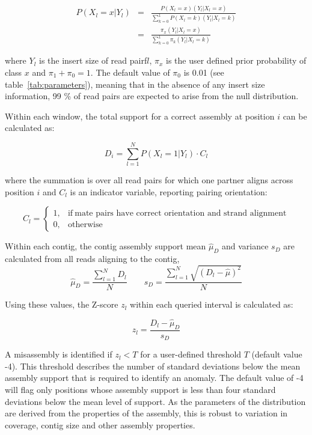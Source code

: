 \documentclass[fleqn,10pt]{wlpeerj}
\begin{document}
\begin{eqnarray} P(X_l=x|Y_l)& =& \frac{P(X_l=x)(Y_l|X_l=x)}{\sum_{k=0}^1P(X_l=k)(Y_l|X_l=k)}\\
  & =& \frac{\pi_x(Y_l|X_l=x)}{\sum_{k=0}^1 \pi_k(Y_l|X_l=k)}
\label{eq:posterior}  
\end{eqnarray}

where $Y_l$ is the insert size of read pairf$l$, $\pi_x$ is the user defined prior probability of class $x$ and $\pi_1 + \pi_0 = 1$. The default value of $\pi_0$ is 0.01 (see table~\ref{tab:parameters}), meaning that in the absence of any insert size information, 99 \% of read pairs are expected to arise from the null distribution.  

Within each window, the total support for a correct assembly at position $i$ can be calculated as:

\begin{equation}
D_i = \sum_{l=1}^N P(X_l=1|Y_l)\cdot C_l
\end{equation}

where the summation is over all read pairs for which one partner aligns across position $i$ and $C_l$ is an indicator variable, reporting pairing orientation:

\begin{equation}
    C_l=
    \begin{cases}
      1, & \text{if}\ \text{mate pairs have correct orientation and strand alignment} \\
      0, & \text{otherwise}
    \end{cases}
  \label{eq:C}
  \end{equation}

Within each contig, the contig assembly support mean $\hat{\mu}_D$ and variance $s_D$ are calculated from all reads aligning to the contig,
\begin{equation}
\hat{\mu}_D = \frac{\sum_{l=1}^N D_l}{N} \qquad s_D = \frac{\sum_{l=1}^N \sqrt{(D_l - \hat{\mu})^2}}{N}
\label{eq:contigD}
\end{equation}

Using these values, the Z-score $z_l$ within each queried interval is calculated as: 

\begin{equation}
z_l = \frac{D_l - \hat{\mu}_D}{s_D}
\label{eq:zscore}
\end{equation}

A misassembly is identified if $z_l < T$ for a user-defined threshold $T$ (default value -4). This threshold describes the number of standard deviations below the mean assembly support that is required to identify an anomaly. The default value of -4 will flag only positions whose assembly support is less than four standard deviations below the mean level of support. As the parameters of the distribution are derived from the properties of the assembly, this is robust to variation in coverage, contig size and other assembly properties.
\end{document}
